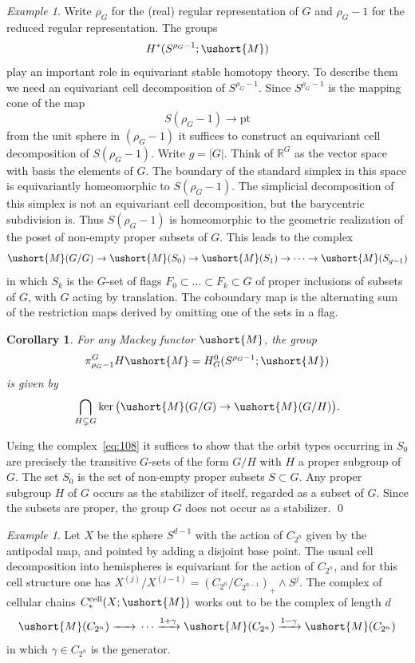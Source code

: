 \documentclass{amsart}
\newtheorem{cor}[equation]{Corollary}
\theoremstyle{definition}
\theoremstyle{remark}
\newtheorem{eg}[equation]{Example}
\newenvironment{pf}{\bigskip{\em Proof:\/}}{\qed\medskip}
\newcommand{\R}{{\mathbb R}}
\newcommand{\Mm}{\ushort{M}}
\newcommand{\ztn}{C_{2^{n}}}
\newcommand{\ztnm}[1]{C_{2^{#1}}}
\begin{document}
\begin{eg}
\label{eg:25}
Write $\rho_{G}$ for the (real) regular representation of $G$ and
$\rho_{G}-1$ for the reduced regular representation.   
The groups
\[
H^{\ast}(S^{\rho_{G}-1};\Mm)
\]
play an important role in equivariant stable homotopy theory.  To
describe them we need an equivariant cell decomposition of
$S^{\rho_{G}-1}$.  Since $S^{\rho_{G}-1}$ is the mapping cone of the
map
\[
S(\rho_{G}-1)\to \text{pt}
\]
from the unit sphere in $(\rho_{G}-1)$ it suffices to construct an
equivariant cell decomposition of $S(\rho_{G}-1)$.  Write $g=|G|$.
Think of $\R^{G}$ as the vector space with basis the elements of $G$.
The boundary of the standard simplex in this space is equivariantly
homeomorphic to $S(\rho_{G}-1)$.  The simplicial decomposition of this
simplex is not an equivariant cell decomposition, but the barycentric
subdivision is.  Thus $S(\rho_{G}-1)$ is homeomorphic to the geometric
realization of the poset of non-empty proper subsets of $G$.  This
leads to the complex
\begin{equation}
\label{eq:108}
\Mm(G/G) \to \Mm(S_{0}) \to \Mm(S_{1})\to\dots \to \Mm(S_{g-1})
\end{equation}
in which $S_{k}$ is the $G$-set of flags $F_{0}\subset\dots\subset
F_{k}\subset G$ of proper inclusions of subsets of $G$, with $G$
acting by translation.  The coboundary map is the alternating sum of
the restriction maps derived by omitting one of the sets in a flag.
\end{eg}

\begin{cor}
\label{thm:188}
For any Mackey functor $\Mm$, the group
\[
\pi_{\rho_{G}-1}^{G}H\Mm = H^{0}_{G}(S^{\rho_{G}-1};\Mm)
\]
is given by
\[
\bigcap_{H\subsetneq G} \ker \big(\Mm(G/G)\to \Mm(G/H)\big).
\]
\end{cor}

\begin{pf}
Using the complex~\eqref{eq:108} it suffices to show
that the orbit types occurring in $S_{0}$ are precisely the transitive
$G$-sets of the form $G/H$ with $H$ a proper subgroup of $G$.  The set
$S_{0}$ is the set of non-empty proper subsets $S\subset G$.  Any
proper subgroup $H$ of $G$ occurs as the stabilizer of itself,
regarded as a subset of $G$.  Since the subsets are proper, the
group $G$ does not occur as a stabilizer.
\end{pf}

\begin{eg}
\label{eg:17} 
Let $X$ be the sphere $S^{d-1}$ with the action of
$\ztn$ given by the antipodal map, and pointed by adding a disjoint
base point.  The usual cell decomposition into hemispheres is
equivariant for the action of $\ztn$, and for this cell structure one
has $X^{(j)}/X^{(j-1)}=(\ztn/\ztnm{n-1})_{+}\wedge S^{j}$.  The
complex of cellular chains $C_{\ast}^{\text{cell}}(X;\Mm)$ works out
to be the complex of length $d$
\[
\Mm(\ztn) \xrightarrow{\phantom{1+\gamma}}{}
\cdots
\xrightarrow{1+\gamma}{}
\Mm(\ztn)\xrightarrow{1-\gamma}{} \Mm(\ztn)
\]
in which $\gamma\in \ztn$ is the generator.   
\end{eg}
\end{document}
